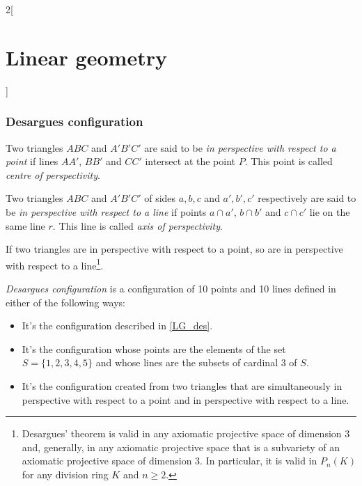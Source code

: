 \documentclass[../../../main_math.tex]{subfiles}
\begin{document}
\begin{multicols}{2}[\section{Linear geometry}]
  \subsubsection{Desargues configuration}
  \begin{definition}
    Two triangles $ABC$ and $A'B'C'$ are said to be \emph{in perspective with respect to a point} if lines $AA'$, $BB'$ and $CC'$ intersect at the point $P$. This point is called \emph{centre of perspectivity}.
  \end{definition}
  \begin{definition}
    Two triangles $ABC$ and $A'B'C'$ of sides $a,b,c$ and $a',b',c'$ respectively are said to be \emph{in perspective with respect to a line} if points $a\cap a'$, $b\cap b'$ and $c\cap c'$ lie on the same line $r$. This line is called \emph{axis of perspectivity}.
  \end{definition}
  \begin{theorem}
    If two triangles are in perspective with respect to a point, so are in perspective with respect to a line\footnote{Desargues' theorem is valid in any axiomatic projective space of dimension 3 and, generally, in any axiomatic projective space that is a subvariety of an axiomatic projective space of dimension 3. In particular, it is valid in $P_n(K)$ for any division ring $K$ and $n\geq2$.}.
  \end{theorem}
  \begin{definition}
    \emph{Desargues configuration} is a configuration of 10 points and 10 lines defined in either of the following ways:
    \begin{itemize}
      \item It's the configuration described in \cref{LG_des}.
            \begin{center}
              \begin{minipage}{\linewidth}
                \centering
                
                \label{LG_des}
              \end{minipage}
            \end{center}
      \item It's the configuration whose points are the elements of the set $S=\{1,2,3,4,5\}$ and whose lines are the subsets of cardinal 3 of $S$.
      \item It's the configuration created from two triangles that are simultaneously in perspective with respect to a point and in perspective with respect to a line.

\end{itemize}
\end{definition}
\end{multicols}
\end{document}
